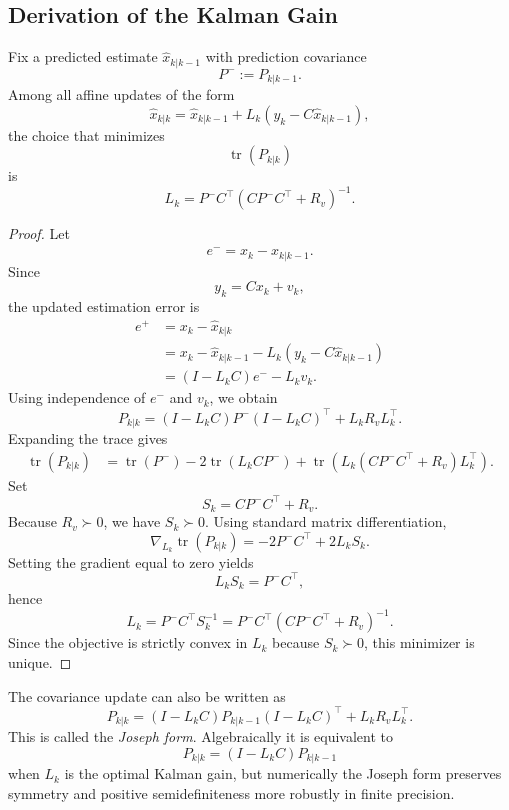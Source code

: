 \subsection{Derivation of the Kalman Gain}
\label{sec:l7-derivation-of-the-kalman-gain}

\begin{theorem}\label{thm:l7-kalman-gain-from-covariance-minimization}
	Fix a predicted estimate $\hat x_{k|k-1}$ with prediction covariance
	\[
		P^- := P_{k|k-1}.
	\]
	Among all affine updates of the form
	\[
		\hat x_{k|k}=\hat x_{k|k-1}+L_k(y_k-C\hat x_{k|k-1}),
	\]
	the choice that minimizes
	\[
		\operatorname{tr}(P_{k|k})
	\]
	is
	\[
		L_k = P^- C^\top(CP^- C^\top + R_v)^{-1}.
	\]
\end{theorem}
\begin{proof}
	Let
	\[
		e^- = x_k-\hat x_{k|k-1}.
	\]
	Since
	\[
		y_k = Cx_k + v_k,
	\]
	the updated estimation error is
	\begin{align*}
		e^+
		&= x_k-\hat x_{k|k} \\
		&= x_k-\hat x_{k|k-1}-L_k(y_k-C\hat x_{k|k-1}) \\
		&= (I-L_k C)e^- - L_k v_k.
	\end{align*}
	Using independence of $e^-$ and $v_k$, we obtain
	\[
		P_{k|k}
		=
		(I-L_k C)P^-(I-L_k C)^\top + L_k R_v L_k^\top.
	\]
	Expanding the trace gives
	\begin{align*}
		\operatorname{tr}(P_{k|k})
		&=
		\operatorname{tr}(P^-)
		-2\operatorname{tr}(L_k C P^-)
		+
		\operatorname{tr}\left(L_k(CP^-C^\top+R_v)L_k^\top\right).
	\end{align*}
	Set
	\[
		S_k = CP^-C^\top+R_v.
	\]
	Because $R_v \succ 0$, we have $S_k \succ 0$. Using standard matrix differentiation,
	\[
		\nabla_{L_k}\operatorname{tr}(P_{k|k})
		=
		-2P^-C^\top + 2L_k S_k.
	\]
	Setting the gradient equal to zero yields
	\[
		L_k S_k = P^- C^\top,
	\]
	hence
	\[
		L_k = P^- C^\top S_k^{-1}
		=
		P^- C^\top(CP^-C^\top+R_v)^{-1}.
	\]
	Since the objective is strictly convex in $L_k$ because $S_k \succ 0$, this minimizer is unique.
\end{proof}

\begin{remark}
	The covariance update can also be written as
	\[
		P_{k|k}
		=
		(I-L_k C)P_{k|k-1}(I-L_k C)^\top + L_k R_v L_k^\top.
	\]
	This is called the \emph{Joseph form}. Algebraically it is equivalent to
	\[
		P_{k|k}=(I-L_k C)P_{k|k-1}
	\]
	when $L_k$ is the optimal Kalman gain, but numerically the Joseph form preserves symmetry and positive semidefiniteness more robustly in finite precision.
\end{remark}

